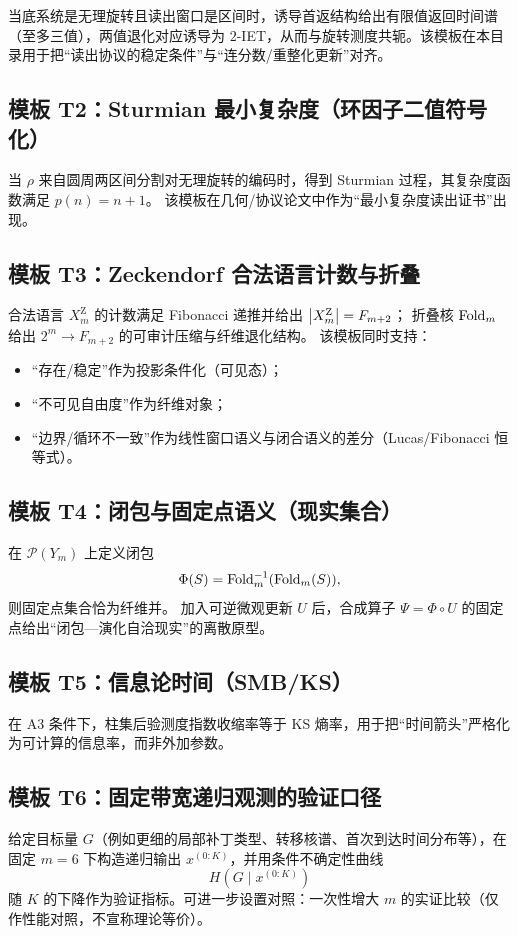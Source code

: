 当底系统是无理旋转且读出窗口是区间时，诱导首返结构给出有限值返回时间谱（至多三值），两值退化对应诱导为 $2$-IET，从而与旋转测度共轭。该模板在本目录用于把“读出协议的稳定条件”与“连分数/重整化更新”对齐。

\subsection{模板 T2：Sturmian 最小复杂度（环因子二值符号化）}

当 $\rho$ 来自圆周两区间分割对无理旋转的编码时，得到 Sturmian 过程，其复杂度函数满足 $p(n)=n+1$。
该模板在几何/协议论文中作为“最小复杂度读出证书”出现。

\subsection{模板 T3：Zeckendorf 合法语言计数与折叠}

合法语言 $X_m^{\mathrm Z}$ 的计数满足 Fibonacci 递推并给出 $\left\lvert X_m^{\mathrm Z}\right\rvert=F_{m+2}$；
折叠核 $\mathrm{Fold}_m$ 给出 $2^m\to F_{m+2}$ 的可审计压缩与纤维退化结构。
该模板同时支持：
\begin{itemize}
  \item “存在/稳定”作为投影条件化（可见态）；
  \item “不可见自由度”作为纤维对象；
  \item “边界/循环不一致”作为线性窗口语义与闭合语义的差分（Lucas/Fibonacci 恒等式）。
\end{itemize}

\subsection{模板 T4：闭包与固定点语义（现实集合）}

在 $\mathcal{P}(Y_m)$ 上定义闭包
\[
\Phi(S)=\mathrm{Fold}_m^{-1}(\mathrm{Fold}_m(S)),
\]
则固定点集合恰为纤维并。
加入可逆微观更新 $U$ 后，合成算子 $\Psi=\Phi\circ U$ 的固定点给出“闭包—演化自洽现实”的离散原型。

\subsection{模板 T5：信息论时间（SMB/KS）}

在 A3 条件下，柱集后验测度指数收缩率等于 KS 熵率，用于把“时间箭头”严格化为可计算的信息率，而非外加参数。

\subsection{模板 T6：固定带宽递归观测的验证口径}给定目标量 $G$（例如更细的局部补丁类型、转移核谱、首次到达时间分布等），在固定 $m=6$ 下构造递归输出 $x^{(0:K)}$，并用条件不确定性曲线
$$
H(G\mid x^{(0:K)})
$$
随 $K$ 的下降作为验证指标。可进一步设置对照：一次性增大 $m$ 的实证比较（仅作性能对照，不宣称理论等价）。